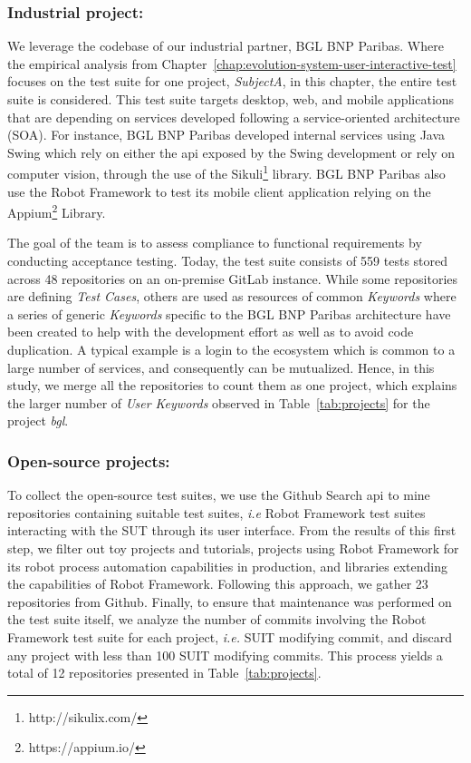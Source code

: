 \subsubsection{Industrial project:}
We leverage the codebase of our industrial partner, BGL BNP Paribas. Where the empirical analysis from Chapter~\ref{chap:evolution-system-user-interactive-test} focuses on the test suite for one project, \emph{SubjectA}, in this chapter, the entire test suite is considered. This test suite targets desktop, web, and mobile applications that are depending on services developed following a service-oriented architecture (SOA). For instance, BGL BNP Paribas developed internal services using Java Swing which rely on either the \gls{api} exposed by the Swing development or rely on computer vision, through the use of the Sikuli\footnote{http://sikulix.com/} library. BGL BNP Paribas also use the Robot Framework to test its mobile client application relying on the Appium\footnote{https://appium.io/} Library.

The goal of the team is to assess compliance to functional requirements by conducting acceptance testing. Today, the test suite consists of 559 tests stored across 48 repositories on an on-premise GitLab instance. While some repositories are defining \emph{Test Cases}, others are used as resources of common \emph{Keywords} where a series of generic \emph{Keywords} specific to the BGL BNP Paribas architecture have been created to help with the development effort as well as to avoid code duplication. A typical example is a login to the ecosystem which is common to a large number of services, and consequently can be mutualized. Hence, in this study, we merge all the repositories to count them as one project, which explains the larger number of \emph{User Keywords} observed in Table~\ref{tab:projects} for the project \emph{bgl}.

\subsubsection{Open-source projects:} 
To collect the open-source test suites, we use the Github Search \gls{api} to mine repositories containing suitable test suites, \emph{i.e} Robot Framework test suites interacting with the SUT through its user interface. From the results of this first step, we filter out toy projects and tutorials, projects using Robot Framework for its robot process automation capabilities in production, and libraries extending the capabilities of Robot Framework. Following this approach, we gather 23 repositories from Github. Finally, to ensure that maintenance was performed on the test suite itself, we analyze the number of commits involving the Robot Framework test suite for each project, \emph{i.e.} SUIT modifying commit, and discard any project with less than 100 SUIT modifying commits. This process yields a total of 12 repositories presented in Table~\ref{tab:projects}.

